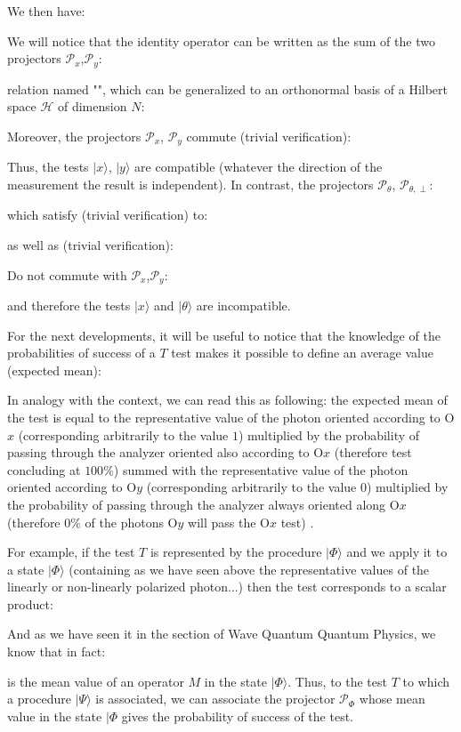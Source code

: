 	We then have:
	
	We will notice that the identity operator can be written as the sum of the two projectors $\mathcal{P}_x$,$\mathcal{P}_y$:
	
	relation named "", which can be generalized to an orthonormal basis of a Hilbert space $\mathcal{H}$ of dimension $N$:
	
	Moreover, the projectors $\mathcal{P}_x$,  $\mathcal{P}_y$ commute (trivial verification):
	
	Thus, the tests $|x\rangle$, $|y\rangle$ are compatible (whatever the direction of the measurement the result is independent). In contrast, the projectors $\mathcal{P}_\theta$, $\mathcal{P}_{\theta,\perp}$:
	
	which satisfy (trivial verification) to:
	
	as well as (trivial verification):
	
	Do not commute with $\mathcal{P}_x$,$\mathcal{P}_y$:
	
	and therefore the tests $|x\rangle$ and $|\theta\rangle$ are incompatible.

	For the next developments, it will be useful to notice that the knowledge of the probabilities of success of a $T$ test makes it possible to define an average value (expected mean):
	
	In analogy with the context, we can read this as following: the expected mean of the test is equal to the representative value of the photon oriented according to O$x$ (corresponding arbitrarily  to the value $1$) multiplied by the probability of passing through the analyzer oriented also according to O$x$ (therefore test concluding at $100\%$) summed with the representative value of the photon oriented according to O$y$ (corresponding arbitrarily to the value $0$) multiplied by the probability of passing through the analyzer always oriented along O$x$ (therefore $0\%$ of the photons O$y$ will pass the O$x$ test) .

	For example, if the test $T$ is represented by the procedure $|\Phi\rangle$ and we apply it to a state $|\Phi\rangle$ (containing as we have seen above the  representative values of the linearly or non-linearly polarized photon...) then the test corresponds to a scalar product:
	
	
	And as we have seen it in the section of Wave Quantum Quantum Physics, we know that in fact:
	
	is the mean value of an operator $M$ in the state $|\Phi\rangle$. Thus, to the test $T$ to which a procedure $|\Psi\rangle$ is associated, we can associate the projector $\mathcal{P}_{\Phi}$ whose mean value in the state $|\Phi$ gives the probability of success of the test.

